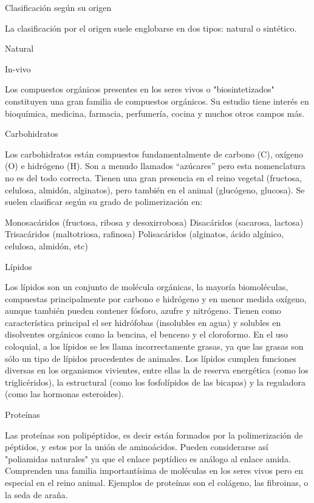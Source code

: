 \documentclass[12pt,letterpaper]{article}
\begin{document}
Clasificación según su origen

La clasificación por el origen suele englobarse en dos tipos: natural o sintético.

Natural

In-vivo

Los compuestos orgánicos presentes en los seres vivos o "biosintetizados" constituyen una gran familia de compuestos orgánicos. Su estudio tiene interés en bioquímica, medicina, farmacia, perfumería, cocina y muchos otros campos más.

Carbohidratos

Los carbohidratos están compuestos fundamentalmente de carbono (C), oxígeno (O) e hidrógeno (H). Son a menudo llamados ``azúcares'' pero esta nomenclatura no es del todo correcta. Tienen una gran presencia en el reino vegetal (fructosa, celulosa, almidón, alginatos), pero también en el animal (glucógeno, glucosa). Se suelen clasificar según su grado de polimerización en:

Monosacáridos (fructosa, ribosa y desoxirrobosa)
Disacáridos (sacarosa, lactosa)
Trisacáridos (maltotriosa, rafinosa)
Polisacáridos (alginatos, ácido algínico, celulosa, almidón, etc)

Lípidos

Los lípidos son un conjunto de molécula orgánicas, la mayoría biomoléculas, compuestas principalmente por carbono e hidrógeno y en menor medida oxígeno, aunque también pueden contener fósforo, azufre y nitrógeno. Tienen como característica principal el ser hidrófobas (insolubles en agua) y solubles en disolventes orgánicos como la bencina, el benceno y el cloroformo. En el uso coloquial, a los lípidos se les llama incorrectamente grasas, ya que las grasas son sólo un tipo de lípidos procedentes de animales. Los lípidos cumplen funciones diversas en los organismos vivientes, entre ellas la de reserva energética (como los triglicéridos), la estructural (como los fosfolípidos de las bicapas) y la reguladora (como las hormonas esteroides).

Proteínas

Las proteínas son polipéptidos, es decir están formados por la polimerización de péptidos, y estos por la unión de aminoácidos. Pueden considerarse así "poliamidas naturales" ya que el enlace peptídico es análogo al enlace amida. Comprenden una familia importantísima de moléculas en los seres vivos pero en especial en el reino animal. Ejemplos de proteínas son el colágeno, las fibroinas, o la seda de araña.
\end{document}
